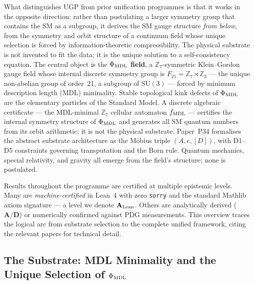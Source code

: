What distinguishes UGP from prior unification programmes is that it works in the
opposite direction: rather than postulating a larger symmetry group that contains
the SM as a subgroup, it derives the SM gauge structure \emph{from below}, from the
symmetry and orbit structure of a continuum field whose unique selection is forced
by information-theoretic compressibility.  The physical substrate is not invented
to fit the data; it is the unique solution to a self-consistency equation.
The central object is the \textbf{$\Phi_{\rm MDL}$ field}, a
$\mathbb{Z}_7$-symmetric Klein--Gordon gauge field whose internal discrete symmetry
group is $F_{21} = \mathbb{Z}_7 \rtimes \mathbb{Z}_3$ --- the unique non-abelian
group of order~21, a subgroup of $\mathrm{SU}(3)$ --- forced by minimum description
length (MDL) minimality.  Stable topological kink defects of $\Phi_{\rm MDL}$ are
the elementary particles of the Standard Model.  A discrete algebraic certificate
--- the MDL-minimal $\mathbb{Z}_7$ cellular automaton $f_{\rm MDL}$ --- certifies
the internal symmetry structure of $\Phi_{\rm MDL}$ and generates all SM quantum
numbers from its orbit arithmetic; it is not the physical substrate.  Paper~P34
formalises the abstract substrate architecture as the Möbius triple $(A,e,[D])$,
with D1--D5 constraints governing transputation and the Born rule.  Quantum
mechanics, special relativity, and gravity all emerge from the field's structure;
none is postulated.

Results throughout the programme are certified at multiple epistemic levels.  Many
are \emph{machine-certified} in Lean~4 with zero \texttt{sorry} and the standard
Mathlib axiom signature --- a level we denote $\mathbf{A}_{\rm Lean}$.  Others are
analytically derived ($\mathbf{A/D}$) or numerically confirmed against PDG
measurements.  This overview traces the logical arc from substrate selection to the
complete unified framework, citing the relevant papers for technical detail.

\subsection{The Substrate: MDL Minimality and the Unique Selection of \texorpdfstring{$\Phi_{\rm MDL}$}{Phi\_MDL}}
\label{subsec:overview-substrate}

